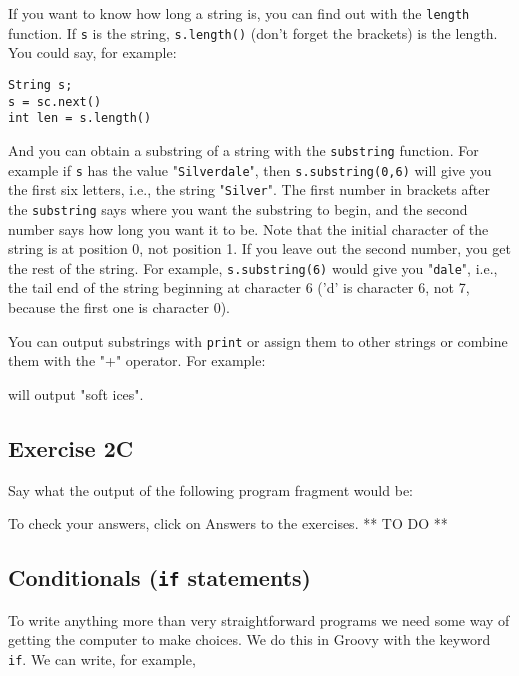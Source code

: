 If you want to know how long a string is, you can find out with the \verb!length!
function.  If  \verb!s! is the string, \verb!s.length()! (don't forget the
brackets) is the length.  You could say, for example:
\begin{Verbatim}
String s;
s = sc.next()
int len = s.length()
\end{Verbatim}
And you can obtain a substring of a string with the \verb!substring! function.
For example if  \verb!s! has the value "\verb!Silverdale!", then
\verb!s.substring(0,6)! will give you the first six letters, i.e., the string
"\verb!Silver!".  The first number in brackets after the \verb!substring!
says where you want the substring to begin, and the second number says how
long you want it to be.  Note that the initial character of the string
is at position 0, not position 1.  If you leave out the second number,
you get the rest of the string.  For example, \verb!s.substring(6)! would
give you "\verb!dale!", i.e., the tail end of the string beginning at character 6
('d' is character 6, not 7, because the first one is character 0).

You can output substrings with \verb!print! or assign them to other
strings or combine them with the "+" operator.  For example:


will output "soft ices".

\subsection*{Exercise 2C}

Say what the output of the following program fragment would be:


To check your answers, click on Answers to the exercises. ** TO DO **

\subsection{Conditionals (\texttt{if} statements)}

To write anything more than very straightforward programs we need some way
of getting the computer to make choices.
We do this in Groovy with the keyword \verb!if!.
We can write, for example,


